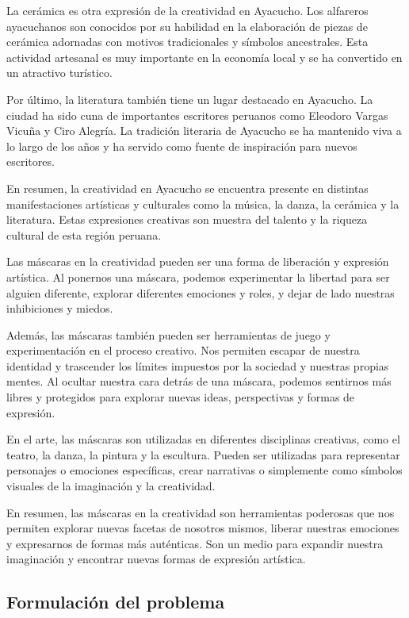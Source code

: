 \documentclass[12pt,a4paper]{article}
\begin{document}
La cerámica es otra expresión de la creatividad en Ayacucho. Los alfareros ayacuchanos son conocidos por su habilidad en la elaboración de piezas de cerámica adornadas con motivos tradicionales y símbolos ancestrales. Esta actividad artesanal es muy importante en la economía local y se ha convertido en un atractivo turístico.

Por último, la literatura también tiene un lugar destacado en Ayacucho. La ciudad ha sido cuna de importantes escritores peruanos como Eleodoro Vargas Vicuña y Ciro Alegría. La tradición literaria de Ayacucho se ha mantenido viva a lo largo de los años y ha servido como fuente de inspiración para nuevos escritores.

En resumen, la creatividad en Ayacucho se encuentra presente en distintas manifestaciones artísticas y culturales como la música, la danza, la cerámica y la literatura. Estas expresiones creativas son muestra del talento y la riqueza cultural de esta región peruana.

Las máscaras en la creatividad pueden ser una forma de liberación y expresión artística. Al ponernos una máscara, podemos experimentar la libertad para ser alguien diferente, explorar diferentes emociones y roles, y dejar de lado nuestras inhibiciones y miedos.

Además, las máscaras también pueden ser herramientas de juego y experimentación en el proceso creativo. Nos permiten escapar de nuestra identidad y trascender los límites impuestos por la sociedad y nuestras propias mentes. Al ocultar nuestra cara detrás de una máscara, podemos sentirnos más libres y protegidos para explorar nuevas ideas, perspectivas y formas de expresión.

En el arte, las máscaras son utilizadas en diferentes disciplinas creativas, como el teatro, la danza, la pintura y la escultura. Pueden ser utilizadas para representar personajes o emociones específicas, crear narrativas o simplemente como símbolos visuales de la imaginación y la creatividad.

En resumen, las máscaras en la creatividad son herramientas poderosas que nos permiten explorar nuevas facetas de nosotros mismos, liberar nuestras emociones y expresarnos de formas más auténticas. Son un medio para expandir nuestra imaginación y encontrar nuevas formas de expresión artística.



\subsection{Formulación del problema}
\end{document}
